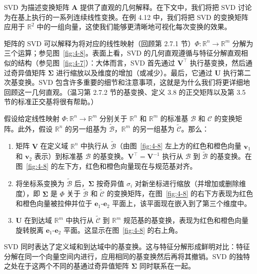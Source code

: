 SVD 为描述变换矩阵 $ \boldsymbol{A} $ 提供了直观的几何解释。在下文中，我们将把 SVD 讨论为在基上执行的一系列连续线性变换。在例 4.12 中，我们将把 SVD 的变换矩阵应用于 $ \mathbb{R}^2 $ 中的一组向量，这使我们能够更清晰地可视化每次变换的效果。

矩阵的 SVD 可以解释为将对应的线性映射（回顾第 2.7.1 节）$ \Phi : \mathbb{R}^n \to \mathbb{R}^m $ 分解为三个运算；参见图~\ref{fig:4-8}。表面上看，SVD 的几何直观遵循与特征分解直观相似的结构（参见图~\ref{fig:4-7}）：大体而言，SVD 首先通过 $ \boldsymbol{V}^\top $ 执行基变换，然后通过奇异值矩阵 $ \boldsymbol{\Sigma} $ 进行缩放以及维度的增加（或减少）。最后，它通过 $ \boldsymbol{U} $ 执行第二次基变换。SVD 包含许多重要的细节和注意事项，这就是为什么我们将更详细地回顾这一几何直观。（温习第 2.7.2 节的基变换、定义 3.8 的正交矩阵以及第 3.5 节的标准正交基将很有帮助。）

假设给定线性映射 $ \Phi : \mathbb{R}^n \to \mathbb{R}^m $ 分别关于 $ \mathbb{R}^n $ 和 $ \mathbb{R}^m $ 的标准基 $ \mathcal{B} $ 和 $ \mathcal{C} $ 的变换矩阵。此外，假设 $ \mathbb{R}^n $ 的另一组基为 $ \tilde{\mathcal{B}} $，$ \mathbb{R}^m $ 的另一组基为 $ \tilde{\mathcal{C}} $。那么：

\begin{enumerate}
\item 矩阵 $ \boldsymbol{V} $ 在定义域 $ \mathbb{R}^n $ 中执行从 $ \tilde{\mathcal{B}} $（由图~\ref{fig:4-8} 左上方的红色和橙色向量 $ \boldsymbol{v}_1 $ 和 $ \boldsymbol{v}_2 $ 表示）到标准基 $ \mathcal{B} $ 的基变换。$ \boldsymbol{V}^\top = \boldsymbol{V}^{-1} $ 执行从 $ \mathcal{B} $ 到 $ \tilde{\mathcal{B}} $ 的基变换。在图~\ref{fig:4-8} 的左下方，红色和橙色向量现在与规范基对齐。
\item 将坐标系变换为 $ \tilde{\mathcal{B}} $ 后，$ \boldsymbol{\Sigma} $ 按奇异值 $ \sigma_i $ 对新坐标进行缩放（并增加或删除维度），即 $ \boldsymbol{\Sigma} $ 是 $ \Phi $ 关于 $ \tilde{\mathcal{B}} $ 和 $ \tilde{\mathcal{C}} $ 的变换矩阵，在图~\ref{fig:4-8} 的右下方表现为红色和橙色向量被拉伸并位于 $ \boldsymbol{e}_1\text{-}\boldsymbol{e}_2 $ 平面上，该平面现在嵌入到了第三个维度中。
\item $ \boldsymbol{U} $ 在到达域 $ \mathbb{R}^m $ 中执行从 $ \tilde{\mathcal{C}} $ 到 $ \mathbb{R}^m $ 规范基的基变换，表现为红色和橙色向量旋转脱离 $ \boldsymbol{e}_1\text{-}\boldsymbol{e}_2 $ 平面。这显示在图~\ref{fig:4-8} 的右上角。
\end{enumerate}

SVD 同时表达了定义域和到达域中的基变换。这与特征分解形成鲜明对比：特征分解在同一个向量空间内进行，应用相同的基变换然后再将其撤销。SVD 的独特之处在于这两个不同的基通过奇异值矩阵 $ \boldsymbol{\Sigma} $ 同时联系在一起。

